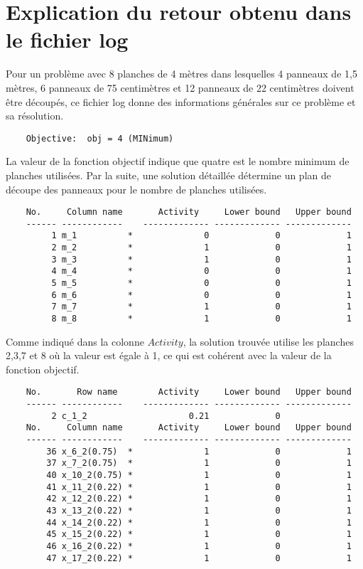 \documentclass{article}[A4]
\begin{document}
\section{Explication du retour obtenu dans le fichier log}
Pour un problème avec 8 planches de 4 mètres dans lesquelles 4 panneaux 
de 1,5 mètres, 6 panneaux de 75 centimètres et 12 panneaux de 22 
centimètres doivent être découpés, ce fichier log donne des informations
générales sur ce problème et sa résolution.
\begin{verbatim}
	Objective:  obj = 4 (MINimum)
\end{verbatim}
La valeur de la fonction objectif indique que quatre est le nombre 
minimum de planches utilisées. Par la suite, une solution détaillée
détermine un plan de découpe des panneaux pour le nombre de planches 
utilisées.
\begin{verbatim}
	No.     Column name       Activity     Lower bound   Upper bound
	------ ------------    ------------- ------------- -------------
	     1 m_1          *              0             0             1 
	     2 m_2          *              1             0             1 
	     3 m_3          *              1             0             1 
	     4 m_4          *              0             0             1 
	     5 m_5          *              0             0             1 
	     6 m_6          *              0             0             1 
	     7 m_7          *              1             0             1 
	     8 m_8          *              1             0             1 

\end{verbatim}
Comme indiqué dans la colonne $Activity$, la solution trouvée utilise 
les planches 2,3,7 et 8 où la valeur est égale à 1, ce qui est cohérent 
avec la valeur de la fonction objectif.
\begin{verbatim}
	No.       Row name        Activity     Lower bound   Upper bound
	------ ------------    ------------- ------------- -------------
	     2 c_1_2                    0.21             0               
	No.     Column name       Activity     Lower bound   Upper bound
	------ ------------    ------------- ------------- -------------
	    36 x_6_2(0.75)  *              1             0             1 
	    37 x_7_2(0.75)  *              1             0             1 
	    40 x_10_2(0.75) *              1             0             1 
	    41 x_11_2(0.22) *              1             0             1 
	    42 x_12_2(0.22) *              1             0             1 
	    43 x_13_2(0.22) *              1             0             1 
	    44 x_14_2(0.22) *              1             0             1 
	    45 x_15_2(0.22) *              1             0             1 
	    46 x_16_2(0.22) *              1             0             1 
	    47 x_17_2(0.22) *              1             0             1 

\end{verbatim}
\end{document}
